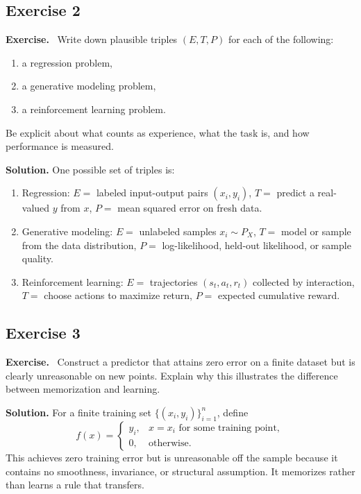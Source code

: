 \documentclass[11pt]{article}
\newenvironment{exercisebox}{\begin{framed}\noindent\textbf{Exercise.}\ }{\end{framed}}
\begin{document}
\subsection*{Exercise 2}
\begin{exercisebox}
Write down plausible triples $(E,T,P)$ for each of the following:
\begin{enumerate}
    \item a regression problem,
    \item a generative modeling problem,
    \item a reinforcement learning problem.
\end{enumerate}
Be explicit about what counts as experience, what the task is, and how performance is measured.
\end{exercisebox}
\textbf{Solution.} One possible set of triples is:
\begin{enumerate}
\item Regression: $E=$ labeled input-output pairs $(x_i,y_i)$, $T=$ predict a real-valued $y$ from $x$, $P=$ mean squared error on fresh data.
\item Generative modeling: $E=$ unlabeled samples $x_i\sim P_X$, $T=$ model or sample from the data distribution, $P=$ log-likelihood, held-out likelihood, or sample quality.
\item Reinforcement learning: $E=$ trajectories $(s_t,a_t,r_t)$ collected by interaction, $T=$ choose actions to maximize return, $P=$ expected cumulative reward.
\end{enumerate}

\subsection*{Exercise 3}
\begin{exercisebox}
Construct a predictor that attains zero error on a finite dataset but is clearly unreasonable on new points. Explain why this illustrates the difference between memorization and learning.
\end{exercisebox}
\textbf{Solution.} For a finite training set $\{(x_i,y_i)\}_{i=1}^n$, define
\[
f(x)=\begin{cases}
y_i,&x=x_i\text{ for some training point},\\
0,&\text{otherwise.}
\end{cases}
\]
This achieves zero training error but is unreasonable off the sample because it contains no smoothness, invariance, or structural assumption. It memorizes rather than learns a rule that transfers.
\end{document}

